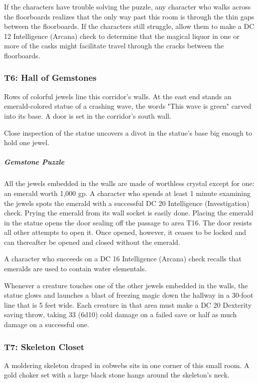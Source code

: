\documentclass[10pt,a4paper,twoside,bg=print,twocolumn,openany,nodeprecatedcode]{dndbook}
\begin{document}
If the characters have trouble solving the puzzle, any character who walks across the floorboards realizes that the only way past this room is through the thin gaps between the floorboards. If the characters still struggle, allow them to make a DC 12 Intelligence (Arcana) check to determine that the magical liquor in one or more of the casks might facilitate travel through the cracks between the floorboards.

\subsubsection{T6: Hall of Gemstones}
\begin{DndReadAloud}{}
Rows of colorful jewels line this corridor's walls. At the east end stands an emerald-colored statue of a crashing wave, the words "This wave is green" carved into its base. A door is set in the corridor's south wall.

\end{DndReadAloud}

Close inspection of the statue uncovers a divot in the statue's base big enough to hold one jewel.

\subparagraph{Gemstone Puzzle}
All the jewels embedded in the walls are made of worthless crystal except for one: an emerald worth 1,000 gp. A character who spends at least 1 minute examining the jewels spots the emerald with a successful DC 20 Intelligence (Investigation) check. Prying the emerald from its wall socket is easily done. Placing the emerald in the statue opens the door sealing off the passage to area T16. The door resists all other attempts to open it. Once opened, however, it ceases to be locked and can thereafter be opened and closed without the emerald.

A character who succeeds on a DC 16 Intelligence (Arcana) check recalls that emeralds are used to contain water elementals.

Whenever a creature touches one of the other jewels embedded in the walls, the statue glows and launches a blast of freezing magic down the hallway in a 30-foot line that is 5 feet wide. Each creature in that area must make a DC 20 Dexterity saving throw, taking 33 (6d10) cold damage on a failed save or half as much damage on a successful one.

\subsubsection{T7: Skeleton Closet}
\begin{DndReadAloud}{}
A moldering skeleton draped in cobwebs sits in one corner of this small room. A gold choker set with a large black stone hangs around the skeleton's neck.

\end{DndReadAloud}
\end{document}
